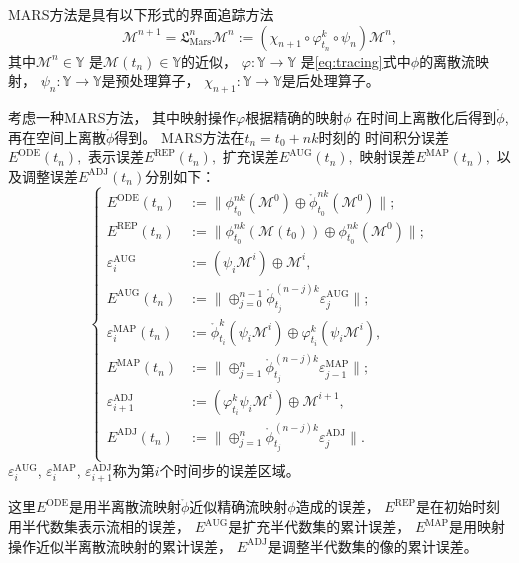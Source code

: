 \begin{defn}
	\label{defn:MARS}
	MARS方法是具有以下形式的界面追踪方法
	\begin{equation*}
	\label{eq:interfaceTrackingMethod}
	{\mathcal M}^{n+1}={\mathfrak L}_{\mathrm{Mars}}^n {\mathcal M}^n
	:= \left(\chi_{n+1}\circ\varphi_{t_n}^k\circ\psi_n
	\right){\mathcal M}^n,
	\end{equation*}
	其中$\mathcal{M}^n\in\mathbb{Y}$ 是$\mathcal{M}(t_n)\in\mathbb{Y}$的近似，
	$\varphi:\mathbb{Y}\rightarrow
	\mathbb{Y}$ 是\eqref{eq:tracing}式中$\phi$的离散流映射， 
	$\psi_n:\mathbb{Y}\rightarrow \mathbb{Y}$是预处理算子，
	$\chi_{n+1}:\mathbb{Y}\rightarrow \mathbb{Y}$是后处理算子。
\end{defn}

\begin{defn}
  考虑一种MARS方法，
  其中映射操作$\varphi$根据精确的映射$\phi$
  在时间上离散化后得到$\mathring{ \phi}$,
  再在空间上离散$\mathring{ \phi}$得到。
  MARS方法在$t_n=t_0+nk$时刻的
  时间积分误差$E^{\mathrm{ODE}}(t_n),$
  表示误差$E^{\mathrm{REP}}(t_n),$
  扩充误差$E^{\mathrm{AUG}}(t_n),$
  映射误差$E^{\mathrm{MAP}}(t_n),$
  以及调整误差$E^{\mathrm{ADJ}}(t_n)$分别如下：
  \begin{equation}\label{defn:error}
    \left\{
      \begin{array}{rl}
	E^{\mathrm{ODE}}(t_n) &:= \| \phi_{t_0}^{nk}(\mathcal{M}^0) \oplus \mathring{ \phi}_{t_0}^{nk}(\mathcal{M}^0) \|;\\[0.2cm]
	E^{\mathrm{REP}}(t_n) &:= \| \phi_{t_0}^{nk}(\mathcal{M}(t_0)) \oplus  \phi_{t_0}^{nk}(\mathcal{M}^0) \|;\\[0.2cm]
	\varepsilon_i^{\mathrm{AUG}} &:=  ( \psi_i \mathcal{M}^i )\oplus \mathcal{M}^i, \\[0.2cm]
	E^{\mathrm{AUG}}(t_n) &:= \| \oplus_{j=0}^{n-1} \mathring{ \phi}_{t_j}^{(n-j)k}\varepsilon_j^{\mathrm{AUG}} \|;\\[0.2cm]
	\varepsilon_i^{\mathrm{MAP}}(t_n)& := \mathring{ \phi}_{t_i}^k(\psi_i\mathcal{M}^i)\oplus \varphi_{t_i}^k(\psi_i\mathcal{M}^i),\\[0.2cm]
	E^{\mathrm{MAP}}(t_n) &:=  \| \oplus_{j=1}^n \mathring{ \phi}_{t_j}^{(n-j)k}\varepsilon_{j-1}^{\mathrm{MAP}} \|;\\[0.2cm]
	\varepsilon_{i+1}^{\mathrm{ADJ}} &:= (\varphi_{t_i}^k\psi_i\mathcal{M}^i)\oplus\mathcal{M}^{i+1},\\[0.2cm]
	E^{\mathrm{ADJ}}(t_n) &:= \| \oplus_{j=1}^n\mathring{ \phi}_{t_j}^{(n-j)k}\varepsilon_j^{\mathrm{ADJ}}\|.\\[0.2cm]
      \end{array}\right.
  \end{equation}
  $\varepsilon_i^{\mathrm{AUG}}$, $\varepsilon_i^{\mathrm{MAP}}$, $\varepsilon_{i+1}^{\mathrm{ADJ}}$称为第$i$个时间步的误差区域。
\end{defn}
这里$E^{\mathrm{ODE}}$是用半离散流映射$\mathring{ \phi}$近似精确流映射$\phi$造成的误差，
$E^{\mathrm{REP}}$是在初始时刻用半代数集表示流相的误差，
$E^{\mathrm{AUG}}$是扩充半代数集的累计误差，
$E^{\mathrm{MAP}}$是用映射操作近似半离散流映射的累计误差，
$E^{\mathrm{ADJ}}$是调整半代数集的像的累计误差。

